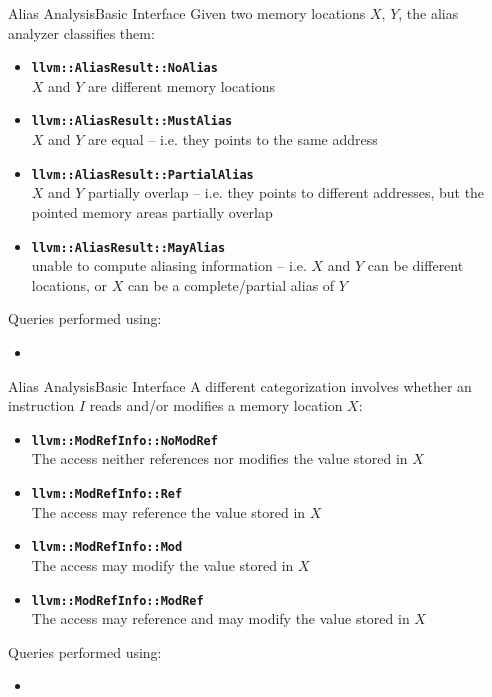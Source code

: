 \begin{frame}{Alias Analysis}{Basic Interface}
Given two memory locations $X$, $Y$, the alias analyzer classifies them:\\
\vfill
\begin{itemize}
\item \texttt{\textbf{llvm::AliasResult::NoAlias}}\\
			$X$ and $Y$ \alert{are
      different} memory locations
\vfill
\item \texttt{\textbf{llvm::AliasResult::MustAlias}}\\
			$X$ and $Y$ \alert{are equal}
      -- i.e. they points to the same address
\vfill
\item \texttt{\textbf{llvm::AliasResult::PartialAlias}}\\
			$X$ and $Y$
      \alert{partially overlap} -- i.e. they points to different addresses,
      but the pointed memory areas partially overlap
\vfill
\item \texttt{\textbf{llvm::AliasResult::MayAlias}}\\
			\alert{unable to compute}
      aliasing information -- i.e. $X$ and $Y$ can be different locations,
      or $X$ can be a complete/partial alias of $Y$
\end{itemize}

\vfill
Queries performed using:
\begin{itemize}
\item {}
\end{itemize}
\end{frame}


\begin{frame}{Alias Analysis}{Basic Interface}
A different categorization involves whether an instruction $I$
\alert{reads and/or modifies} a memory location $X$:\\
\vfill
\begin{itemize}
\item \texttt{\textbf{llvm::ModRefInfo::NoModRef}}\\
			The access neither references nor modifies the value stored in $X$
\vfill
\item \texttt{\textbf{llvm::ModRefInfo::Ref}}\\
			The access may reference the value stored in $X$ 
\vfill
\item \texttt{\textbf{llvm::ModRefInfo::Mod}}\\
			The access may modify the value stored in $X$ 
\vfill
\item \texttt{\textbf{llvm::ModRefInfo::ModRef}}\\
			The access may reference and may modify the value stored in $X$
\end{itemize}

\vfill
Queries performed using:
\begin{itemize}
\item {}
\end{itemize}
\end{frame}


